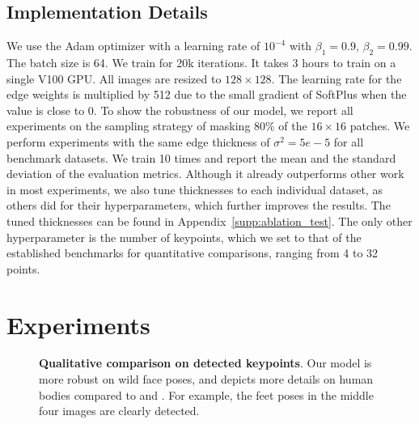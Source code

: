 \documentclass{article}
\begin{document}
\subsection{Implementation Details} \label{sec:implementation_details}
We use the Adam optimizer \cite{KingmaB14} with a learning rate of $10^{-4}$ with $\beta_1=0.9$, $\beta_2=0.99$. The batch size is 64. We train for 20k iterations. It takes 3 hours to train on a single V100 GPU. All images are resized to $128\times 128$. The learning rate for the edge weights is multiplied by 512 due to the small gradient of SoftPlus \cite{dugas2000incorporating} when the value is close to 0.
To show the robustness of our model, we report all experiments on the sampling strategy of masking 80\% of the $16\times 16$ patches. 
We perform experiments with the same edge thickness of $\sigma^2=5e-5$ for all benchmark datasets. 
We train 10 times and report the mean and the standard deviation of the evaluation metrics. 
Although it already outperforms other work in most experiments, we also tune thicknesses to each individual dataset, as others did for their hyperparameters, which further improves the results. The tuned thicknesses can be found in Appendix~\ref{supp:ablation_test}.
The only other hyperparameter is the number of keypoints, which we set to that of the established benchmarks for quantitative comparisons, ranging from 4 to 32 points. \section{Experiments} \label{experiment}

\begin{figure}[t]
\centering
  \caption{\textbf{Qualitative comparison on detected keypoints}. Our model is more robust on wild face poses, and depicts more details on human bodies compared to \cite{he2021latentkeypointgan} and \cite{he2022ganseg}. For example, the feet poses in the middle four images are clearly detected.}
\label{fig:qualitative}
\end{figure}
\end{document}
